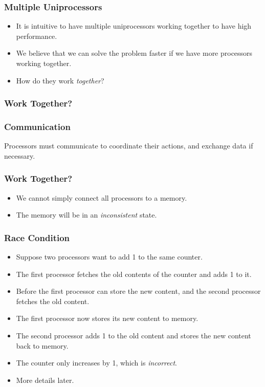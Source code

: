 \documentclass{beamer}
\begin{document}
\begin{CJK}{UTF8}{bsmi}
\begin{frame}
\frametitle{Multiple Uniprocessors}
\begin{itemize}
\item It is intuitive to have multiple uniprocessors working together to have high performance.
\item We believe that we can solve the problem faster if we have more processors working together.
\item How do they work {\em together}?
\end{itemize}
\end{frame}

\begin{frame}
\frametitle{Work Together?}
\centerline{}
\end{frame}

\begin{frame}
\frametitle{Communication} 
\huge Processors must communicate to
coordinate their actions, and exchange data if necessary.
\end{frame}


\begin{frame}
\frametitle{Work Together?}
\centerline{}
\begin{itemize}
\item We cannot simply connect all processors to a memory.
\item The memory will be in an {\em inconsistent} state.
\end{itemize}
\end{frame}

\begin{frame}
\frametitle{Race Condition}
\begin{itemize}
\item Suppose two processors want to add 1 to the same counter.
\item The first processor fetches the old contents of the counter and adds 1 to it.
\item Before the first processor can store the new content, and the second processor fetches the old content.
\item The first processor now stores its new content to memory.
\item The second processor adds 1 to the old content and stores the new content back to memory.
\item The counter only increases by 1, which is {\em incorrect}.
\item More details later.
\end{itemize}
\end{frame}



\end{CJK}
\end{document}
